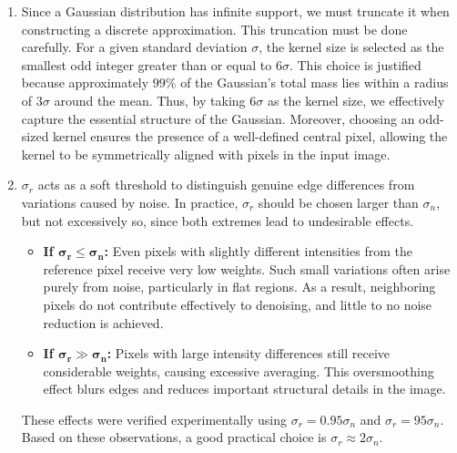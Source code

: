 \documentclass[11pt, a4]{article}
\begin{document}
\begin{enumerate}
			\begin{enumerate}[label=\arabic*., start=1]
				\item Since a Gaussian distribution has infinite support, we must truncate it when constructing a discrete approximation. This truncation must be done carefully. For a given standard deviation $\sigma$, the kernel size is selected as the smallest odd integer greater than or equal to $6\sigma$. This choice is justified because approximately $99\%$ of the Gaussian’s total mass lies within a radius of $3\sigma$ around the mean. Thus, by taking $6\sigma$ as the kernel size, we effectively capture the essential structure of the Gaussian. Moreover, choosing an odd-sized kernel ensures the presence of a well-defined central pixel, allowing the kernel to be symmetrically aligned with pixels in the input image.
				\item $\sigma_r$ acts as a soft threshold to distinguish genuine edge differences from variations caused by noise. In practice, $\sigma_r$ should be chosen larger than $\sigma_n$, but not excessively so, since both extremes lead to undesirable effects.  
				
				\begin{itemize}
					\item \textbf{If $\boldsymbol{\sigma_r \leq \sigma_n}$:}  
					Even pixels with slightly different intensities from the reference pixel receive very low weights. Such small variations often arise purely from noise, particularly in flat regions. As a result, neighboring pixels do not contribute effectively to denoising, and little to no noise reduction is achieved.  
					
					\item \textbf{If $\boldsymbol{\sigma_r \gg \sigma_n}$:}  
					Pixels with large intensity differences still receive considerable weights, causing excessive averaging. This oversmoothing effect blurs edges and reduces important structural details in the image.  
				\end{itemize}
				
				These effects were verified experimentally using $\sigma_r = 0.95\sigma_n$ and $\sigma_r = 95\sigma_n$.  
				Based on these observations, a good practical choice is $\sigma_r \approx 2\sigma_n$.  
				
			\end{enumerate}
		\end{enumerate}
\end{document}
